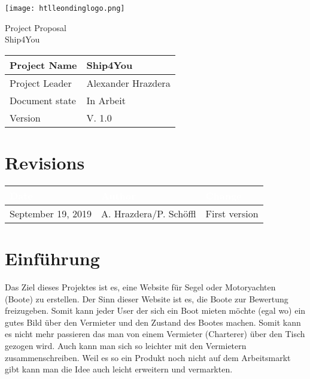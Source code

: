 \documentclass[12pt]{article}
\theoremstyle{definition}
\newenvironment{explanation}{%
   \setlength{\parindent}{0pt}
   \itshape
   \color{blue}
}{}
\newcommand{\projectname}{Ship4You}
\newcommand{\productname}{Ship4You}
\newcommand{\projectleader}{Alexander Hrazdera}
\newcommand{\documentstatus}{In Arbeit}
\newcommand{\version}{V. 1.0}
\begin{document}
\begin{titlepage}
\begin{flushright}
\texttt{[image: htlleondinglogo.png]}\\
\end{flushright}

\vspace{10em}

\begin{center}
{\Huge Project Proposal} \\[3em]
{\LARGE \productname} \\[3em]
\end{center}

\begin{flushleft}
\begin{tabular}{|l|l|}
\hline
Project Name & \projectname \\ \hline
Project Leader & \projectleader \\ \hline
Document state & \documentstatus \\ \hline
Version & \version \\ \hline
\end{tabular}
\end{flushleft}

\end{titlepage}
\section*{Revisions}
\begin{tabular}{|l|l|l|}
\hline
\cellcolor[gray]{0.5}\textcolor{white}{Date} & \cellcolor[gray]{0.5}\textcolor{white}{Author} & \cellcolor[gray]{0.5}\textcolor{white}{Change} \\ \hline
September 19, 2019&A. Hrazdera/P. Schöffl&First version \\ \hline
\end{tabular}
\pagebreak

\tableofcontents
\pagebreak

\section{Einführung}
\begin{explanation}
Das Ziel dieses Projektes ist es, eine Website für Segel oder Motoryachten (Boote) zu erstellen. Der Sinn dieser Website ist es, die Boote zur Bewertung freizugeben. Somit kann jeder User der sich ein Boot mieten möchte (egal wo) ein gutes Bild über den Vermieter und den Zustand des Bootes machen. Somit kann es nicht mehr passieren das man von einem Vermieter (Charterer) über den Tisch gezogen wird. Auch kann man sich so leichter mit den Vermietern zusammenschreiben. Weil es so ein Produkt noch nicht auf dem Arbeitsmarkt gibt kann man die Idee auch leicht erweitern und vermarkten. 

\end{explanation}
\pagebreak
\end{document}
